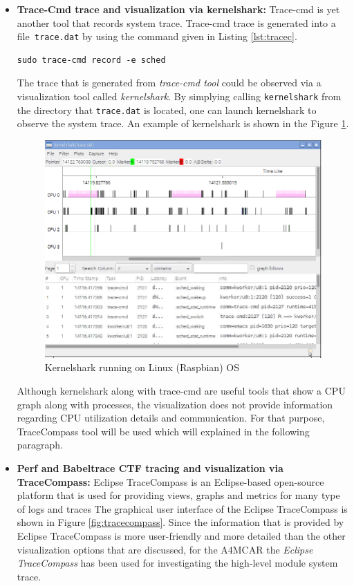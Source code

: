 \begin{itemize}
	\item \textbf{Trace-Cmd trace and visualization via kernelshark:}
	Trace-cmd \cite{tracecmd} is yet another tool that records system trace. Trace-cmd trace is generated into a file\texttt{ trace.dat} by using the command given in Listing \ref{lst:tracec}.
	\begin{lstlisting}[caption={Recording a system trace using trace-cmd},label={lst:tracec},style=bash]
		sudo trace-cmd record -e sched
	\end{lstlisting}
	The trace that is generated from \textit{trace-cmd tool} could be observed via a visualization tool called \textit{kernelshark}. By simplying calling \texttt{kernelshark} from the directory that \texttt{trace.dat} is located, one can launch kernelshark to observe the system trace. An example of kernelshark is shown in the Figure \ref{fig:kernelshark}.
	\begin{figure}[!ht]
		\centering
		\captionsetup{justification=centering}
		\includegraphics[scale=0.55]{content/images/kernelshark.png}
		\caption{Kernelshark running on Linux (Raspbian) OS}
		\label{fig:kernelshark}
	\end{figure}
	Although kernelshark along with trace-cmd are useful tools that show a CPU graph along with processes, the visualization does not provide information regarding CPU utilization details and communication. For that purpose, TraceCompass tool will be used which will explained in the following paragraph. 
	\item \textbf{Perf and Babeltrace CTF tracing and visualization via TraceCompass:} 	Eclipse TraceCompass \cite{tracecompass} is an Eclipse-based open-source platform that is used for providing views, graphs and metrics for many type of logs and traces \cite{tracecompass} The graphical user interface of the Eclipse TraceCompass is shown in Figure \ref{fig:tracecompass}. Since the information that is provided by Eclipse TraceCompass is more user-friendly and more detailed than the other visualization options that are discussed, for the A4MCAR the \textit{Eclipse TraceCompass} has been used for investigating the high-level module system trace.
	

\end{itemize}
